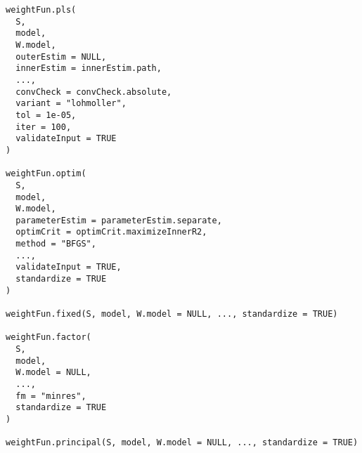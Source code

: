 \documentclass[a4paper]{book}
\begin{document}
%
\begin{Usage}
\begin{verbatim}
weightFun.pls(
  S,
  model,
  W.model,
  outerEstim = NULL,
  innerEstim = innerEstim.path,
  ...,
  convCheck = convCheck.absolute,
  variant = "lohmoller",
  tol = 1e-05,
  iter = 100,
  validateInput = TRUE
)

weightFun.optim(
  S,
  model,
  W.model,
  parameterEstim = parameterEstim.separate,
  optimCrit = optimCrit.maximizeInnerR2,
  method = "BFGS",
  ...,
  validateInput = TRUE,
  standardize = TRUE
)

weightFun.fixed(S, model, W.model = NULL, ..., standardize = TRUE)

weightFun.factor(
  S,
  model,
  W.model = NULL,
  ...,
  fm = "minres",
  standardize = TRUE
)

weightFun.principal(S, model, W.model = NULL, ..., standardize = TRUE)
\end{verbatim}
\end{Usage}
%
\end{document}

